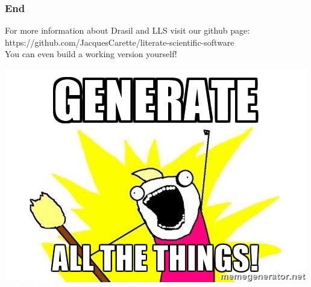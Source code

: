 \documentclass{beamer}
\begin{document}
\begin{frame}
\frametitle{End}
For more information about Drasil and LLS visit our github page: \\
https://github.com/JacquesCarette/literate-scientific-software \\
\alert{You can even build a working version yourself!}
\newline
\newline
\begin{center}
\includegraphics[scale=0.5]{../WG2_11/generate_all_the_things.jpg}
\end{center}
\end{frame}
\end{document}
